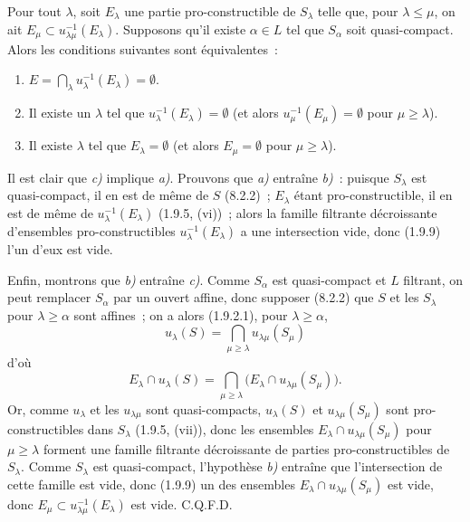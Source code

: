 \begin{corollary}[8.3.3]
\label{IV.8.3.3-fr}
Pour tout $\lambda$, soit $E_\lambda$ une partie pro-constructible de
$S_\lambda$ telle que, pour $\lambda\leq\mu$, on ait
$E_\mu\subset u_{\lambda\mu}^{-1}(E_\lambda)$. Supposons qu'il existe
$\alpha\in L$ tel que $S_\alpha$ soit quasi-compact. Alors les conditions
suivantes sont équivalentes~:
\begin{enumerate}
\item[\emph{a)}]
$E=\bigcap_\lambda u_\lambda^{-1}(E_\lambda)=\emptyset$.
\item[\emph{b)}] Il existe un $\lambda$ tel que
$u_\lambda^{-1}(E_\lambda)=\emptyset$ \textup{(et alors
$u_\mu^{-1}(E_\mu)=\emptyset$ pour $\mu\geq\lambda$)}.
\item[\emph{c)}] Il existe $\lambda$ tel que $E_\lambda=\emptyset$ \textup{(et alors
$E_\mu=\emptyset$ pour $\mu\geq\lambda$)}.
\end{enumerate}
\end{corollary}

Il est clair que \emph{c)} implique \emph{a)}. Prouvons que \emph{a)} entraîne
\emph{b)}~: puisque $S_\lambda$ est quasi-compact, il en est de même de $S$
(8.2.2)~; $E_\lambda$ étant pro-constructible, il en est de même de
$u_\lambda^{-1}(E_\lambda)$ (1.9.5, (vi))~; alors la famille filtrante
décroissante d'ensembles pro-constructibles $u_\lambda^{-1}(E_\lambda)$ a
une intersection vide, donc (1.9.9) l'un d'eux est vide.

Enfin, montrons que \emph{b)} entraîne \emph{c)}. Comme $S_\alpha$ est
quasi-compact et $L$ filtrant, on peut remplacer $S_\alpha$ par un ouvert
affine, donc supposer (8.2.2) que $S$ et les $S_\lambda$ pour
$\lambda\geq\alpha$ sont affines~; on a alors (1.9.2.1), pour
$\lambda\geq\alpha$,
\[
u_\lambda(S)=\bigcap_{\mu\geq\lambda}u_{\lambda\mu}(S_\mu)
\]
d'où
\[
E_\lambda\cap u_\lambda(S)=
\bigcap_{\mu\geq\lambda}
\bigl(E_\lambda\cap u_{\lambda\mu}(S_\mu)\bigr).
\]
Or, comme $u_\lambda$ et les $u_{\lambda\mu}$ sont quasi-compacts,
$u_\lambda(S)$ et $u_{\lambda\mu}(S_\mu)$ sont pro-constructibles dans
$S_\lambda$ (1.9.5, (vii)), donc les ensembles
$E_\lambda\cap u_{\lambda\mu}(S_\mu)$ pour $\mu\geq\lambda$ forment une
famille filtrante décroissante de parties pro-constructibles de $S_\lambda$.
Comme $S_\lambda$ est quasi-compact, l'hypothèse \emph{b)} entraîne que
l'intersection de cette famille est vide, donc (1.9.9) un des ensembles
$E_\lambda\cap u_{\lambda\mu}(S_\mu)$ est vide, donc
$E_\mu\subset u_{\lambda\mu}^{-1}(E_\lambda)$ est vide. C.Q.F.D.

